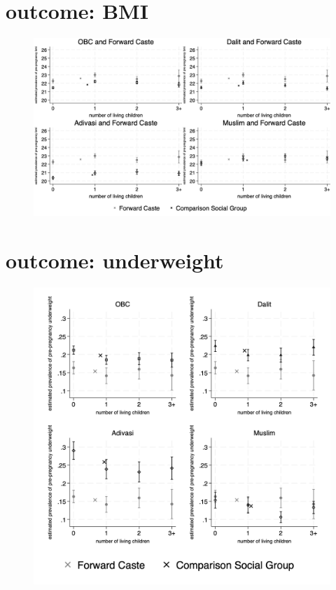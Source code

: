 \documentclass{article}
\begin{document}
\section{outcome: BMI}
\begin{figure}[H]
    \centering
    \includegraphics[width=\textwidth]{figures/prepreg_bmi_combined.png}
\end{figure}

\section{outcome: underweight}
\begin{figure}[H]
    \centering
    \includegraphics[width=\textwidth]{figures/prepreg_underweight_combined.png}
\end{figure}
\end{document}
